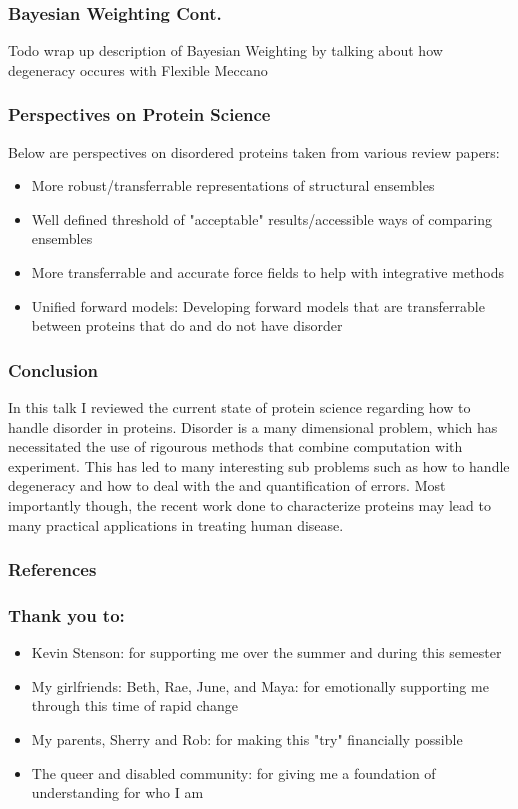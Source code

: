 \documentclass{beamer}
\begin{document}
\begin{frame}
    \frametitle{Bayesian Weighting Cont.}
Todo wrap up description of Bayesian Weighting by talking about how degeneracy occures with Flexible Meccano
\end{frame}
\begin{frame}
    \frametitle{Perspectives on Protein Science}
    Below are perspectives on disordered proteins taken from various review papers:
    \begin{itemize}
        \item More robust/transferrable representations of structural ensembles \cite{bonomiDeterminationProteinStructural2019}
        \item Well defined threshold of "acceptable" results/accessible ways of comparing ensembles \cite{bonomiDeterminationProteinStructural2019}
        \item More transferrable and accurate force fields to help with integrative methods \cite{thomasenConformationalEnsemblesIntrinsically2022}
        \item Unified forward models: Developing forward models that are transferrable between proteins that do and do not have disorder \cite{thomasenConformationalEnsemblesIntrinsically2022}
    \end{itemize}
\end{frame}

\begin{frame}
    \frametitle{Conclusion}
    In this talk I reviewed the current state of protein science regarding how to handle disorder in proteins.
    Disorder is a many dimensional problem, which has necessitated the use of rigourous methods that combine computation with experiment.
    This has led to many interesting sub problems such as how to handle degeneracy and how to deal with the and quantification of errors.
    Most importantly though, the recent work done to characterize proteins may lead to many practical applications in treating human disease.

\end{frame}

\begin{frame}
\frametitle{References}
\printbibliography

\end{frame}

\begin{frame}
    \frametitle{Thank you to:} 
    \begin{itemize}
        \item Kevin Stenson: for supporting me over the summer and during this semester
        \item My girlfriends: Beth, Rae, June, and Maya: for emotionally supporting me through this time of rapid change
        \item My parents, Sherry and Rob: for making this "try" financially possible
        \item The queer and disabled community: for giving me a foundation of understanding for who I am
    \end{itemize}
\end{frame}
\end{document}
